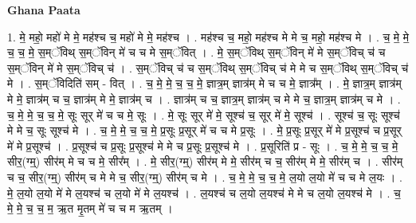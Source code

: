 \documentclass[17pt]{extarticle}
\begin{document}
\textbf{Ghana Paata } \newline

1. मे॒ महो॒ महो॑ मे मे॒ मह॑श्च च॒ महो॑ मे मे॒ मह॑श्च । . मह॑श्च च॒ महो॒ मह॑श्च मे मे च॒ महो॒ मह॑श्च मे । . च॒ मे॒ मे॒ च॒ च॒ मे॒ स॒म्ॅविथ् स॒म्ॅविन् मे॑ च च मे स॒म्ॅवित् । . मे॒ स॒म्ॅविथ् स॒म्ॅविन् मे॑ मे स॒म्ॅविच् च॑ च स॒म्ॅविन् मे॑ मे स॒म्ॅविच् च॑ । . स॒म्ॅविच् च॑ च स॒म्ॅविथ् स॒म्ॅविच् च॑ मे मे च स॒म्ॅविथ् स॒म्ॅविच् च॑ मे । . स॒म्ॅविदिति॑ सम् - वित् । . च॒ मे॒ मे॒ च॒ च॒ मे॒ ज्ञात्र॒म् ज्ञात्र॑म् मे च च मे॒ ज्ञात्र᳚म् । . मे॒ ज्ञात्र॒म् ज्ञात्र॑म् मे मे॒ ज्ञात्र॑म् च च॒ ज्ञात्र॑म् मे मे॒ ज्ञात्र॑म् च । . ज्ञात्र॑म् च च॒ ज्ञात्र॒म् ज्ञात्र॑म् च मे मे च॒ ज्ञात्र॒म् ज्ञात्र॑म् च मे । . च॒ मे॒ मे॒ च॒ च॒ मे॒ सूः सूर् मे॑ च च मे॒ सूः । . मे॒ सूः सूर् मे॑ मे॒ सूश्च॑ च॒ सूर् मे॑ मे॒ सूश्च॑ । . सूश्च॑ च॒ सूः सूश्च॑ मे मे च॒ सूः सूश्च॑ मे । . च॒ मे॒ मे॒ च॒ च॒ मे॒ प्र॒सूः प्र॒सूर् मे॑ च च मे प्र॒सूः । . मे॒ प्र॒सूः प्र॒सूर् मे॑ मे प्र॒सूश्च॑ च प्र॒सूर् मे॑ मे प्र॒सूश्च॑ । . प्र॒सूश्च॑ च प्र॒सूः प्र॒सूश्च॑ मे मे च प्र॒सूः प्र॒सूश्च॑ मे । . प्र॒सूरिति॑ प्र - सूः । . च॒ मे॒ मे॒ च॒ च॒ मे॒ सीर॒(ग्म्॒) सीर॑म् मे च च मे॒ सीर᳚म् । . मे॒ सीर॒(ग्म्॒) सीर॑म् मे मे॒ सीर॑म् च च॒ सीर॑म् मे मे॒ सीर॑म् च । . सीर॑म् च च॒ सीर॒(ग्म्॒) सीर॑म् च मे मे च॒ सीर॒(ग्म्॒) सीर॑म् च मे । . च॒ मे॒ मे॒ च॒ च॒ मे॒ ल॒यो ल॒यो मे॑ च च मे ल॒यः । . मे॒ ल॒यो ल॒यो मे॑ मे ल॒यश्च॑ च ल॒यो मे॑ मे ल॒यश्च॑ । . ल॒यश्च॑ च ल॒यो ल॒यश्च॑ मे मे च ल॒यो ल॒यश्च॑ मे । . च॒ मे॒ मे॒ च॒ च॒ म॒ ऋ॒त मृ॒तम् मे॑ च च म ऋ॒तम् । \newline
\end{document}
